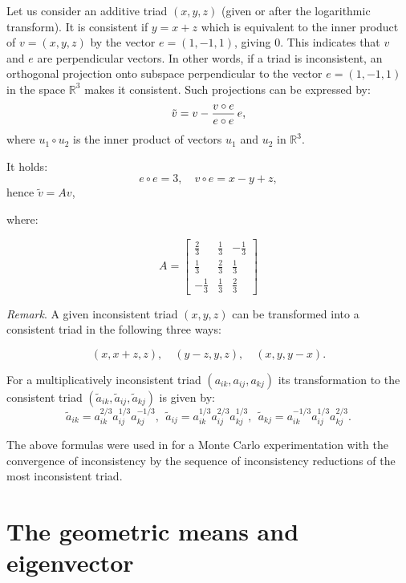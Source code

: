 \documentclass [12pt]{article}
\theoremstyle{definition}
\begin{document}
Let us consider an additive triad  $(x,y,z)$ (given or after the logarithmic transform). It is consistent if $y=x+z$ which is equivalent to the inner product of  $v=(x,y,z)$ by the vector $e=(1,-1,1)$, giving 0. This indicates that $v$ and $e$ are perpendicular vectors. In other words, if a triad is inconsistent, an orthogonal projection onto subspace perpendicular to the vector  $e=(1,-1,1)$ in the space $\mathbb{R}^3$ makes it consistent.
Such projections can be expressed by:
 $$ \tilde{v}=v - {v \circ e\over e\circ e} \, e,$$
 where $ u_1\circ u_2 $ is the inner product of vectors $u_1$  and $u_2$ in $\mathbb{R}^3.$ \\

\begin{flushleft}
It holds: $$ e\circ e=3,\quad v \circ e= x-y+z,$$ hence $\tilde{v}=Av$, \\

\begin{flushleft}
where:
\end{flushleft}
\end{flushleft}
$$A=\left[
\begin{array}{rrr}
\frac{2}{3} & \frac{1}{3} & -\frac{1}{3} \\
\frac{1}{3} & \frac{2}{3} & \frac{1}{3} \\
-\frac{1}{3} & \frac{1}{3} & \frac{2}{3}
\end{array}
\right]
$$

\begin{flushleft}
{\em Remark}. A given inconsistent triad $(x,y,z)$ can be transformed into a consistent triad in the following three ways:
\end{flushleft}$$
(x,x+z,z),\quad
(y-z,y,z),\quad
(x,y, y-x).
$$

For a multiplicatively inconsistent triad $(a_{ik}, a_{ij}, a_{kj})$ its transformation to the consistent triad 
$(\tilde a_{ik}, \tilde a_{ij}, \tilde a_{kj})$ is given by:
$$
\tilde a_{ik}= a_{ik}^{2/3}a_{ij}^{1/3}a_{kj}^{-1/3},~~
\tilde a_{ij}= a_{ik}^{1/3}a_{ij}^{2/3}a_{kj}^{1/3},~~
\tilde a_{kj}= a_{ik}^{-1/3}a_{ij}^{1/3}a_{kj}^{2/3}.
$$

The above formulas were used in \cite{KKSX2015} for a Monte Carlo experimentation with the convergence of inconsistency by the sequence of inconsistency reductions of the most inconsistent triad.

\section{The geometric means and eigenvector}
\end{document}
